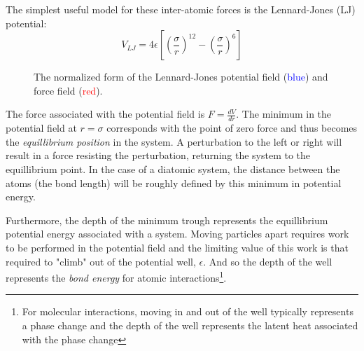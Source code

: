 \documentclass[twocolumn]{memoir} %
\begin{document}
The simplest useful model for these inter-atomic forces is the Lennard-Jones (LJ) potential:
%
\begin{equation}
    V_{LJ} = 4 \epsilon \left[\left(\frac{\sigma}{r}\right)^{12} - \left(\frac{\sigma}{r}\right)^{6}\right]
    \label{eq:lj_potential}
\end{equation}
%
\begin{figure}[H]
    \caption{The normalized form of the Lennard-Jones potential field (\textcolor{blue}{blue}) 
    and force field (\textcolor{red}{red}).}
\end{figure}
%
The force associated with the potential field is $F = \frac{dV}{dr}$.  The minimum in the 
potential field at $r = \sigma$ corresponds with the point of zero force and thus becomes the 
\emph{equillibrium position} in the system.  A perturbation to the left or right will result in
a force resisting the perturbation, returning the system to the equillibrium point.  
In the case of a diatomic system, the distance between the atoms (the bond length) will be roughly
defined by this minimum in potential energy.

Furthermore, the depth of the minimum trough represents the equillibrium potential energy associated
with a system.  Moving particles apart requires work to be performed in the potential field and the limiting
value of this work is that required to "climb" out of the potential well, $\epsilon$.  And so the depth of
the well represents the \emph{bond energy} for atomic interactions\footnote{For molecular interactions, 
moving in and out of the well typically represents a phase change and the depth of the well represents
the latent heat associated with the phase change}.
\end{document}
